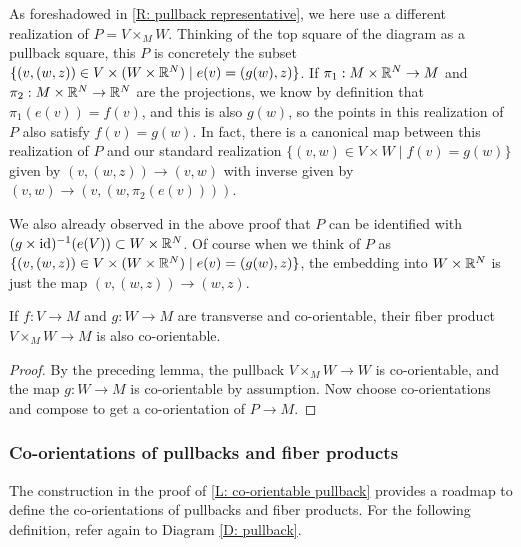 \begin{remark}\label{R: pullback representative 2}
	As foreshadowed in \cref{R: pullback representative}, we here use a different realization of $P=V\times_MW$.
	Thinking of the top square of the diagram as a pullback square, this $P$ is concretely the subset $\{(v,(w,z))\in V\times (W\times \mathbb{R}^N)\mid e(v)=(g(w),z)\}$.
	If $\pi_1:M\times \mathbb{R}^N\to M$ and $\pi_2:M\times \mathbb{R}^N\to \mathbb{R}^N$ are the projections, we know by definition that $\pi_1(e(v))=f(v)$, and this is also $g(w)$, so the points in this realization of $P$ also satisfy $f(v)=g(w)$.
	In fact, there is a canonical map between this realization of $P$ and our standard realization $\{(v,w)\in V\times W\mid f(v)=g(w)\}$ given by $(v,(w,z))\to (v,w)$ with inverse given by $(v,w)\to (v,(w,\pi_2(e(v))))$.

	We also already observed in the above proof that $P$ can be identified with $(g\times \mathrm{id})^{-1}(e(V))\subset W\times \mathbb{R}^N$.
	Of course when we think of $P$ as $\{(v,(w,z))\in V\times (W\times \mathbb{R}^N)\mid e(v)=(g(w),z)\}$, the embedding into $W\times \mathbb{R}^N$ is just the map $(v,(w,z))\to (w,z)$.
\end{remark}

\begin{corollary}
	If $f \colon V \to M$ and $g \colon W \to M$ are transverse and co-orientable, their fiber product $V\times_MW \to M$ is also co-orientable.
\end{corollary}

\begin{proof}
	By the preceding lemma, the pullback $V\times_MW\to W$ is co-orientable, and the map $g \colon W \to M$ is co-orientable by assumption.
	Now choose co-orientations and compose to get a co-orientation of $P\to M$.
\end{proof}

\subsubsection{Co-orientations of pullbacks and fiber products}\label{S: co-orientation of pullbacks}

The construction in the proof of \cref{L: co-orientable pullback} provides a roadmap to define the co-orientations of pullbacks and fiber products.
For the following definition, refer again to Diagram \eqref{D: pullback}.

